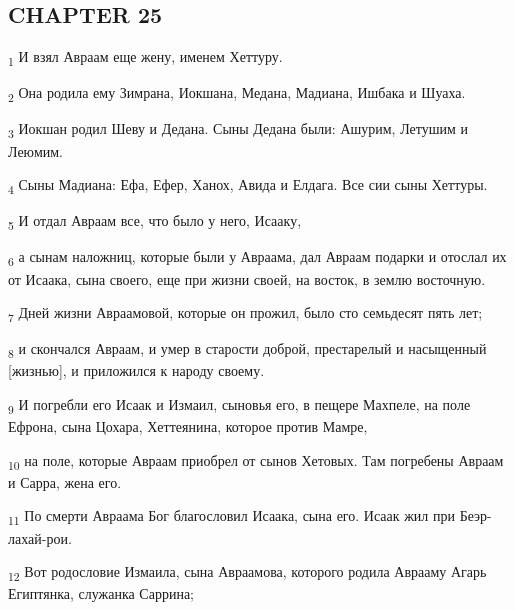 \subsection{CHAPTER 25}
\begin{tcolorbox}
\textsubscript{1} И взял Авраам еще жену, именем Хеттуру.
\end{tcolorbox}
\begin{tcolorbox}
\textsubscript{2} Она родила ему Зимрана, Иокшана, Медана, Мадиана, Ишбака и Шуаха.
\end{tcolorbox}
\begin{tcolorbox}
\textsubscript{3} Иокшан родил Шеву и Дедана. Сыны Дедана были: Ашурим, Летушим и Леюмим.
\end{tcolorbox}
\begin{tcolorbox}
\textsubscript{4} Сыны Мадиана: Ефа, Ефер, Ханох, Авида и Елдага. Все сии сыны Хеттуры.
\end{tcolorbox}
\begin{tcolorbox}
\textsubscript{5} И отдал Авраам все, что было у него, Исааку,
\end{tcolorbox}
\begin{tcolorbox}
\textsubscript{6} а сынам наложниц, которые были у Авраама, дал Авраам подарки и отослал их от Исаака, сына своего, еще при жизни своей, на восток, в землю восточную.
\end{tcolorbox}
\begin{tcolorbox}
\textsubscript{7} Дней жизни Авраамовой, которые он прожил, было сто семьдесят пять лет;
\end{tcolorbox}
\begin{tcolorbox}
\textsubscript{8} и скончался Авраам, и умер в старости доброй, престарелый и насыщенный [жизнью], и приложился к народу своему.
\end{tcolorbox}
\begin{tcolorbox}
\textsubscript{9} И погребли его Исаак и Измаил, сыновья его, в пещере Махпеле, на поле Ефрона, сына Цохара, Хеттеянина, которое против Мамре,
\end{tcolorbox}
\begin{tcolorbox}
\textsubscript{10} на поле, которые Авраам приобрел от сынов Хетовых. Там погребены Авраам и Сарра, жена его.
\end{tcolorbox}
\begin{tcolorbox}
\textsubscript{11} По смерти Авраама Бог благословил Исаака, сына его. Исаак жил при Беэр-лахай-рои.
\end{tcolorbox}
\begin{tcolorbox}
\textsubscript{12} Вот родословие Измаила, сына Авраамова, которого родила Аврааму Агарь Египтянка, служанка Саррина;
\end{tcolorbox}
